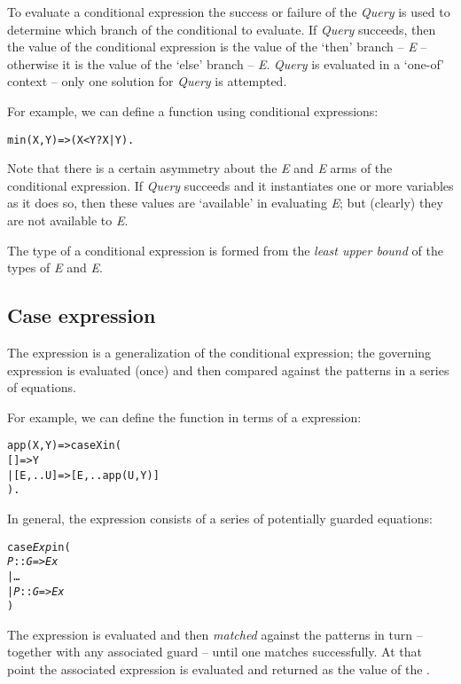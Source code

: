 To evaluate a conditional expression the success or failure of the \emph{Query} is used to determine which branch of the conditional to evaluate. If \emph{Query} succeeds, then the value of the conditional expression is the value of the `then' branch -- \emph{E} -- otherwise it is the value of the `else' branch -- \emph{E}. \emph{Query} is evaluated in a `one-of' context -- only one solution for \emph{Query} is attempted.

For example, we can define a  function using conditional expressions:
\begin{alltt}
min(X,Y) => (X<Y ? X | Y).
\end{alltt}
Note that there is a certain asymmetry about the \emph{E} and \emph{E} arms of the conditional expression. If \emph{Query} succeeds and it instantiates one or more variables as it does so, then these values are `available' in evaluating \emph{E}; but (clearly) they are not available to \emph{E}.

The type of a conditional expression is formed from the \emph{least upper bound} of the types of \emph{E} and \emph{E}.

\subsection{Case expression}
\label{expression:case}
The  expression is a generalization of the conditional expression; the governing expression is evaluated (once) and then compared against the patterns in a series of equations.

For example, we can define the  function in terms of a  expression:
\begin{alltt}
app(X,Y) => case X in (
  [] => Y
| [E,..U] => [E,..app(U,Y)]
).
\end{alltt}
In general, the  expression consists of a series of potentially guarded equations:
\begin{alltt}
case \emph{Exp} in (
  \emph{P}::\emph{G} => \emph{Ex}
| \ldots
| \emph{P\subn}::\emph{G\subn}  => \emph{Ex\subn}
)
\end{alltt}
The expression  is evaluated and then \emph{matched} against the patterns  in turn -- together with any associated guard -- until one matches successfully. At that point the associated expression  is evaluated and returned as the value of the .


